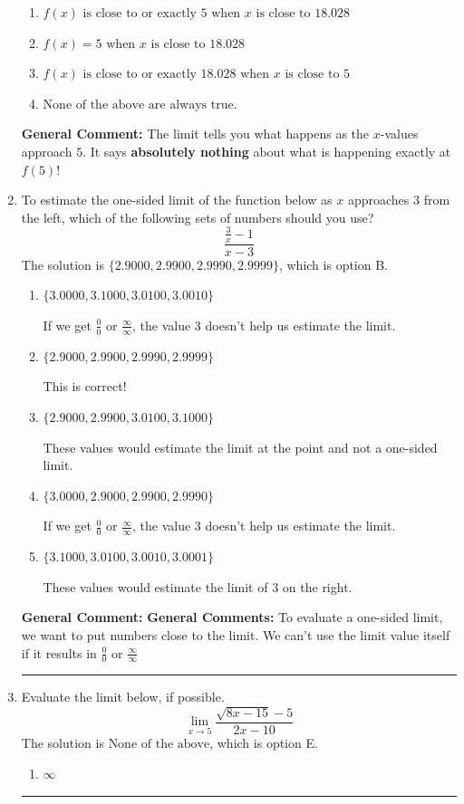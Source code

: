 \documentclass{extbook}[14pt]
\newcommand{\litem}[1]{\item #1

\rule{\textwidth}{0.4pt}}
\begin{document}
\begin{enumerate}
{\begin{enumerate}[label=\Alph*.]
\item \( f(x) \text{ is close to or exactly } 5 \text{ when } x \text{ is close to } 18.028 \)


\item \( f(x) = 5 \text{ when } x \text{ is close to } 18.028 \)


\item \( f(x) \text{ is close to or exactly } 18.028 \text{ when } x \text{ is close to } 5 \)


\item \( \text{None of the above are always true.} \)


\end{enumerate}

\textbf{General Comment:} The limit tells you what happens as the $x$-values approach $5$. It says \textbf{absolutely nothing} about what is happening exactly at $f(5)$!
}
\litem{
To estimate the one-sided limit of the function below as $x$ approaches 3 from the left, which of the following sets of numbers should you use?
\[ \frac{\frac{3}{x} - 1}{x - 3} \]The solution is \( \{ 2.9000, 2.9900, 2.9990, 2.9999 \} \), which is option B.\begin{enumerate}[label=\Alph*.]
\item \( \{ 3.0000, 3.1000, 3.0100, 3.0010 \} \)

If we get $\frac{0}{0}$ or $\frac{\infty}{\infty}$, the value 3 doesn't help us estimate the limit.
\item \( \{ 2.9000, 2.9900, 2.9990, 2.9999 \} \)

This is correct!
\item \( \{ 2.9000, 2.9900, 3.0100, 3.1000 \} \)

These values would estimate the limit at the point and not a one-sided limit.
\item \( \{ 3.0000, 2.9000, 2.9900, 2.9990 \} \)

If we get $\frac{0}{0}$ or $\frac{\infty}{\infty}$, the value 3 doesn't help us estimate the limit.
\item \( \{ 3.1000, 3.0100, 3.0010, 3.0001 \} \)

These values would estimate the limit of 3 on the right.
\end{enumerate}

\textbf{General Comment:} \textbf{General Comments:} To evaluate a one-sided limit, we want to put numbers close to the limit. We can't use the limit value itself if it results in $\frac{0}{0}$ or $\frac{\infty}{\infty}$
}
\litem{
Evaluate the limit below, if possible.
\[ \lim_{x \rightarrow 5} \frac{\sqrt{8x - 15} - 5}{2x - 10} \]The solution is \( \text{None of the above} \), which is option E.\begin{enumerate}[label=\Alph*.]
\item \( \infty \)


\end{enumerate}}
\end{enumerate}
\end{document}
